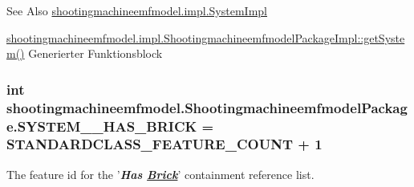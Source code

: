 \begin{DoxySeeAlso}{See Also}
\hyperlink{classshootingmachineemfmodel_1_1impl_1_1_system_impl}{shootingmachineemfmodel.\-impl.\-System\-Impl} 

\hyperlink{classshootingmachineemfmodel_1_1impl_1_1_shootingmachineemfmodel_package_impl_a79cabfebb9a8de6c66ef4b36772d16d1}{shootingmachineemfmodel.\-impl.\-Shootingmachineemfmodel\-Package\-Impl\-::get\-System()} Generierter Funktionsblock 
\end{DoxySeeAlso}
\hypertarget{interfaceshootingmachineemfmodel_1_1_shootingmachineemfmodel_package_adf7f88eb19fda1f4366b83c260d0bc0c}{
\subsubsection[{S\-Y\-S\-T\-E\-M\-\_\-\-\_\-\-H\-A\-S\-\_\-\-B\-R\-I\-C\-K}]{\setlength{\rightskip}{0pt plus 5cm}int shootingmachineemfmodel.\-Shootingmachineemfmodel\-Package.\-S\-Y\-S\-T\-E\-M\-\_\-\-\_\-\-H\-A\-S\-\_\-\-B\-R\-I\-C\-K = {\bf S\-T\-A\-N\-D\-A\-R\-D\-C\-L\-A\-S\-S\-\_\-\-F\-E\-A\-T\-U\-R\-E\-\_\-\-C\-O\-U\-N\-T} + 1}}\label{interfaceshootingmachineemfmodel_1_1_shootingmachineemfmodel_package_adf7f88eb19fda1f4366b83c260d0bc0c}
The feature id for the '{\itshape {\bfseries Has \hyperlink{interfaceshootingmachineemfmodel_1_1_brick}{Brick}}}' containment reference list.

